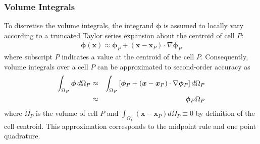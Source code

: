 \documentclass[sn-mathphys,Numbered]{sn-jnl}%
\newcommand{\bb}{\boldsymbol}
\begin{document}
\subsubsection{Volume Integrals}
To discretise the volume integrals, the integrand $\bb{\phi}$ is assumed to locally vary according to a truncated Taylor series expansion about the centroid of cell $P$:
\begin{eqnarray}
	\bb{\phi}(\bb{x})  \approx \bb{\phi}_P + (\bb{x} - \bb{x}_P) \cdot \nabla \bb{\phi}_P
\end{eqnarray}
where subscript $P$ indicates a value at the centroid of the cell $P$.
Consequently, volume integrals over a cell $P$ can be approximated to second-order accuracy as
\begin{eqnarray} \label{eq:volume_integral}
	\int_{\Omega_P} \bb{\phi} \, d \Omega_P
		&\approx& \int_{\Omega_P}  \left[ \bb{\phi}_P + (\bb{x} - \bb{x}_P) \cdot \nabla \bb{\phi}_P \right] d \Omega_P \notag \\
		&\approx& \bb{\phi}_P \Omega_P
\end{eqnarray}
where $\Omega_P$ is the volume of cell $P$ and $\int_{\Omega_P} (\bb{x} - \bb{x}_P) d\Omega_P \equiv 0$ by definition of the cell centroid.
This approximation corresponds to the midpoint rule and one point quadrature.
\end{document}
